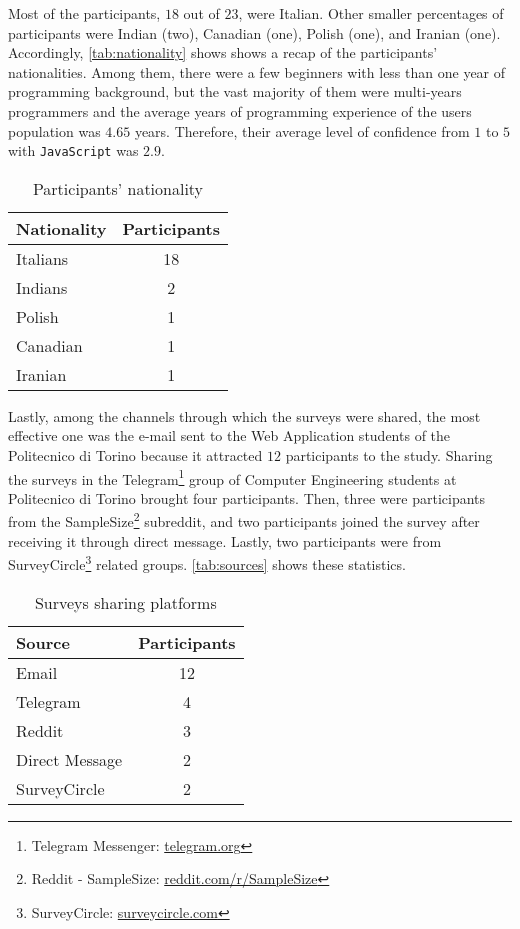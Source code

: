 Most of the participants, $18$ out of $23$, were Italian. Other smaller percentages of participants were Indian (two), Canadian (one), Polish (one), and Iranian (one). Accordingly, \autoref{tab:nationality} shows shows a recap of the participants' nationalities. Among them, there were a few beginners with less than one year of programming background, but the vast majority of them were multi-years programmers and the average years of programming experience of the users population was $4.65$ years. Therefore, their average level of confidence from $1$ to $5$ with \texttt{JavaScript} was $2.9$.

\begin{table}[h!]
        \centering
        \begin{tabular}{| l | c |}
        \hline
        \textbf{Nationality} & \textbf{Participants}\\
        \hline
        Italians & 18\\
        \hline
        Indians & 2\\
        \hline
        Polish & 1\\
        \hline
        Canadian & 1\\
        \hline
        Iranian & 1\\
        \hline
        \end{tabular}
        \caption{Participants' nationality}
        \label{tab:nationality}
\end{table}
    
Lastly, among the channels through which the surveys were shared, the most effective one was the e-mail sent to the Web Application students of the Politecnico di Torino because it  attracted $12$ participants to the study. Sharing the surveys in the Telegram\footnote{Telegram Messenger: \href{https://telegram.org}{telegram.org}} group of Computer Engineering students at Politecnico di Torino brought four participants. Then, three were participants from the SampleSize\footnote{Reddit - SampleSize: \href{https://www.reddit.com/r/SampleSize/}{reddit.com/r/SampleSize}} subreddit, and two participants joined the survey after receiving it through direct message. Lastly, two participants were from SurveyCircle\footnote{SurveyCircle: \href{https://www.surveycircle.com/en/}{surveycircle.com}} related groups. \autoref{tab:sources} shows these statistics.

\begin{table}[h!]
    \centering
    \begin{tabular}{| l | c |}
    \hline
    \textbf{Source} & \textbf{Participants}\\
    \hline
    Email & 12\\
    \hline
    Telegram & 4\\
    \hline
    Reddit & 3\\
    \hline
    Direct Message & 2\\
    \hline
    SurveyCircle & 2\\
    \hline
    \end{tabular}
    \caption{Surveys sharing platforms}
    \label{tab:sources}
\end{table}







